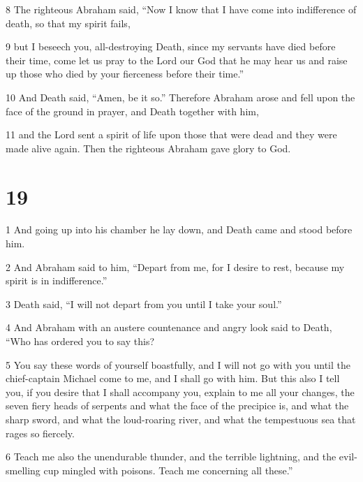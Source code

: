 \par 8 The righteous Abraham said, “Now I know that I have come into indifference of death, so that my spirit fails, 

\par 9 but I beseech you, all-destroying Death, since my servants have died before their time, come let us pray to the Lord our God that he may hear us and raise up those who died by your fierceness before their time.” 

\par 10 And Death said, “Amen, be it so.” Therefore Abraham arose and fell upon the face of the ground in prayer, and Death together with him, 

\par 11 and the Lord sent a spirit of life upon those that were dead and they were made alive again. Then the righteous Abraham gave glory to God.

\chapter{19}

\par 1 And going up into his chamber he lay down, and Death came and stood before him. 

\par 2 And Abraham said to him, “Depart from me, for I desire to rest, because my spirit is in indifference.” 

\par 3 Death said, “I will not depart from you until I take your soul.” 

\par 4 And Abraham with an austere countenance and angry look said to Death, “Who has ordered you to say this? 

\par 5 You say these words of yourself boastfully, and I will not go with you until the chief-captain Michael come to me, and I shall go with him. But this also I tell you, if you desire that I shall accompany you, explain to me all your changes, the seven fiery heads of serpents and what the face of the precipice is, and what the sharp sword, and what the loud-roaring river, and what the tempestuous sea that rages so fiercely. 

\par 6 Teach me also the unendurable thunder, and the terrible lightning, and the evil-smelling cup mingled with poisons. Teach me concerning all these.”

